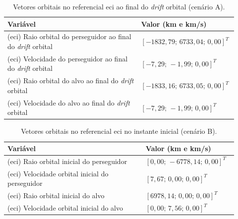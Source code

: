 \begin{table}[H]
\centering
\caption{Vetores orbitais no referencial \gls{eci} ao final do \emph{drift} orbital (cenário A).}
\label{tab_cap4_eciA_final}
\begingroup
\small
\setlength{\tabcolsep}{4pt}
\renewcommand{\arraystretch}{1.15}
\begin{tabular}{|p{0.58\linewidth}|p{0.34\linewidth}|}
\hline
Variável & Valor (km e km/s)\\
\hline
(\gls{eci}) Raio orbital do perseguidor ao final do \emph{drift} orbital &
$\left[-1832,79;\,6733,04;\,0,00\right]^T$\\
\hline
(\gls{eci}) Velocidade do perseguidor ao final do \emph{drift} orbital &
$\left[-7,29;\,-1,99;\,0,00\right]^T$\\
\hline
(\gls{eci}) Raio orbital do alvo ao final do \emph{drift} orbital &
$\left[-1833,16;\,6733,05;\,0,00\right]^T$\\
\hline
(\gls{eci}) Velocidade do alvo ao final do \emph{drift} orbital &
$\left[-7,29;\,-1,99;\,0,00\right]^T$\\
\hline
\end{tabular}
\endgroup
\end{table}


\begin{table}[H]
\centering
\caption{Vetores orbitais no referencial \gls{eci} no instante inicial (cenário B).}
\label{tab_cap4_eciB_inicial}
\begingroup
\small
\setlength{\tabcolsep}{4pt}
\renewcommand{\arraystretch}{1.15}
\begin{tabular}{|p{0.58\linewidth}|p{0.34\linewidth}|}
\hline
Variável & Valor (km e km/s)\\
\hline
(\gls{eci}) Raio orbital inicial do perseguidor &
$\left[0,00;\,-6778,14;\,0,00\right]^T$\\
\hline
(\gls{eci}) Velocidade orbital inicial do perseguidor &
$\left[7,67;\,0,00;\,0,00\right]^T$\\
\hline
(\gls{eci}) Raio orbital inicial do alvo &
$\left[6978,14;\,0,00;\,0,00\right]^T$\\
\hline
(\gls{eci}) Velocidade orbital inicial do alvo &
$\left[0,00;\,7,56;\,0,00\right]^T$\\
\hline
\end{tabular}
\endgroup
\end{table}

